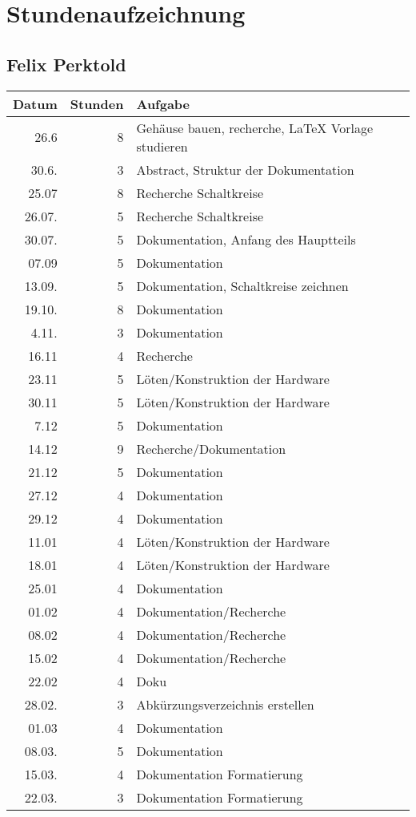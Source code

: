 \chapter{Stundenaufzeichnung}

\section{Felix Perktold}
\label{sec:org02b8e2f}
\begin{center}
\begin{tabular}{rrl}
\hline
Datum & Stunden & Aufgabe\\
\hline
26.6 & 8 & Gehäuse bauen, recherche, \LaTeX{} Vorlage studieren\\
30.6. & 3 & Abstract, Struktur der Dokumentation\\
25.07 & 8 & Recherche Schaltkreise\\
26.07. & 5 & Recherche Schaltkreise\\
30.07. & 5 & Dokumentation, Anfang des Hauptteils\\
07.09 & 5 & Dokumentation\\
13.09. & 5 & Dokumentation, Schaltkreise zeichnen\\
19.10. & 8 & Dokumentation\\
4.11. & 3 & Dokumentation\\
16.11 & 4 & Recherche\\
23.11 & 5 & Löten/Konstruktion der Hardware\\
30.11 & 5 & Löten/Konstruktion der Hardware\\
7.12 & 5 & Dokumentation\\
14.12 & 9 & Recherche/Dokumentation\\
21.12 & 5 & Dokumentation\\
27.12 & 4 & Dokumentation\\
29.12 & 4 & Dokumentation\\
11.01 & 4 & Löten/Konstruktion der Hardware\\
18.01 & 4 & Löten/Konstruktion der Hardware\\
25.01 & 4 & Dokumentation\\
01.02 & 4 & Dokumentation/Recherche\\
08.02 & 4 & Dokumentation/Recherche\\
15.02 & 4 & Dokumentation/Recherche\\
22.02 & 4 & Doku\\
28.02. & 3 & Abkürzungsverzeichnis erstellen\\
01.03 & 4 & Dokumentation\\
08.03. & 5 & Dokumentation\\
15.03. & 4 & Dokumentation Formatierung\\
22.03. & 3 & Dokumentation Formatierung\\
\hline
\end{tabular}
\end{center}

